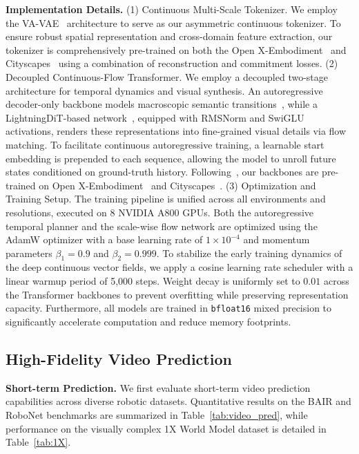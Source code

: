 \textbf{Implementation Details.} 
(1) Continuous Multi-Scale Tokenizer.
We employ the VA-VAE~\cite{yao2025reconstruction} architecture to serve as our asymmetric continuous tokenizer. To ensure robust spatial representation and cross-domain feature extraction, our tokenizer is comprehensively pre-trained on both the Open X-Embodiment~\cite{o2024open} and Cityscapes~\cite{Cityscapes} using a combination of reconstruction and commitment losses.
(2) Decoupled Continuous-Flow Transformer.
We employ a decoupled two-stage architecture for temporal dynamics and visual synthesis. An autoregressive decoder-only backbone models macroscopic semantic transitions~\cite{wang2025sampo}, while a LightningDiT-based network~\cite{yao2025reconstruction}, equipped with RMSNorm and SwiGLU activations, renders these representations into fine-grained visual details via flow matching. To facilitate continuous autoregressive training, a learnable start embedding is prepended to each sequence, allowing the model to unroll future states conditioned on ground-truth history. Following~\cite{wang2025sampo}, our backbones are pre-trained on Open X-Embodiment~\cite{o2024open} and Cityscapes~\cite{Cityscapes}.
(3) Optimization and Training Setup.
The training pipeline is unified across all environments and resolutions, executed on 8 NVIDIA A800 GPUs. Both the autoregressive temporal planner and the scale-wise flow network are optimized using the AdamW optimizer with a base learning rate of $1 \times 10^{-4}$ and momentum parameters $\beta_1=0.9$ and $\beta_2=0.999$. To stabilize the early training dynamics of the deep continuous vector fields, we apply a cosine learning rate scheduler with a linear warmup period of 5,000 steps. Weight decay is uniformly set to $0.01$ across the Transformer backbones to prevent overfitting while preserving representation capacity. 
Furthermore, all models are trained in \texttt{bfloat16} mixed precision to significantly accelerate computation and reduce memory footprints.


\subsection{High-Fidelity Video Prediction}

\textbf{Short-term Prediction.}
We first evaluate short-term video prediction capabilities across diverse robotic datasets. Quantitative results on the BAIR and RoboNet benchmarks are summarized in Table~\ref{tab:video_pred}, while performance on the visually complex 1X World Model dataset is detailed in Table~\ref{tab:1X}.
 

